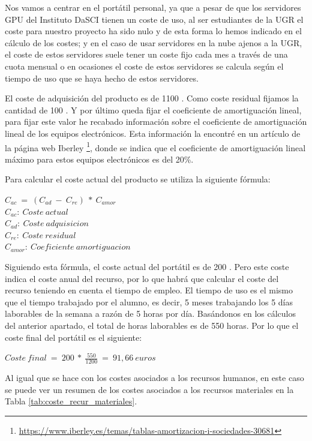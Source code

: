Nos vamos a centrar en el portátil personal, ya que a pesar de que los servidores GPU del Instituto DaSCI tienen un coste de uso, al ser estudiantes de la UGR el coste para nuestro proyecto ha sido nulo y de esta forma lo hemos indicado en el cálculo de los costes; y en el caso de usar servidores en la nube ajenos a la UGR, el coste de estos servidores suele tener un coste fijo cada mes a través de una cuota mensual o en ocasiones el coste de estos servidores se calcula según el tiempo de uso que se haya hecho de estos servidores.

El coste de adquisición del producto es de 1100 \EURtm. Como coste residual fijamos la cantidad de 100 \EURtm. Y por último queda fijar el coeficiente de amortiguación lineal, para fijar este valor he recabado información sobre el coeficiente de amortiguación lineal de los equipos electrónicos. Esta información la encontré en un artículo de la página web Iberley \footnote{\url{https://www.iberley.es/temas/tablas-amortizacion-i-sociedades-30681}}, donde se indica que el coeficiente de amortiguación lineal máximo para estos equipos electrónicos es del 20\%.

Para calcular el coste actual del producto se utiliza la siguiente fórmula:

\begin{center}
$C_{ac}\ =\ (C_{ad}\ -\ C_{re})\ *\ C_{amor}$\\
$C_{ac}:\ Coste\ actual$\\
$C_{ad}:\ Coste\ adquisicion$\\
$C_{re}:\ Coste\ residual$\\
$C_{amor}:\ Coeficiente\ amortiguacion$
\end{center}

Siguiendo esta fórmula, el coste actual del portátil es de 200 \EURtm. Pero este coste indica el coste anual del recurso, por lo que habrá que calcular el coste del recurso teniendo en cuenta el tiempo de empleo. El tiempo de uso es el mismo que el tiempo trabajado por el alumno, es decir, 5 meses trabajando los 5 días laborables de la semana a razón de 5 horas por día. Basándonos en los cálculos del anterior apartado, el total de horas laborables es de 550 horas. Por lo que el coste final del portátil es el siguiente:

\begin{center}
$Coste\ final\ =\ 200\ *\ \frac{550}{1200}\ =\ 91,66\ euros$
\end{center}

Al igual que se hace con los costes asociados a los recursos humanos, en este caso se puede ver un resumen de los costes asociados a los recursos materiales en la Tabla \ref{tab:coste_recur_materiales}.

